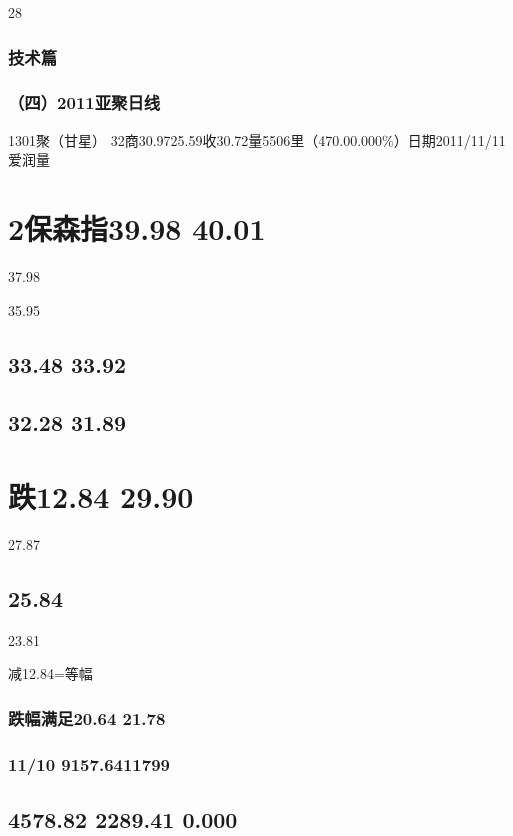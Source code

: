 \documentclass{article}
\begin{document}
28

\clearpage

\subsubsection{技术篇}

\subsubsection{（四）2011亚聚日线}

1301聚（甘星） 32商30.9725.59收30.72量5506里（470.00.000\%）日期2011/11/11 爱润量

\section{2保森指39.98 40.01}

37.98

35.95

\subsection{33.48 33.92}

\subsection{32.28 31.89}

\section{跌12.84 29.90}

27.87

\subsection{25.84}

23.81

减12.84=等幅

\subsubsection{跌幅满足20.64 21.78}

\subsubsection{11/10 9157.6411799}

\subsection{4578.82 2289.41 0.000}
\end{document}
